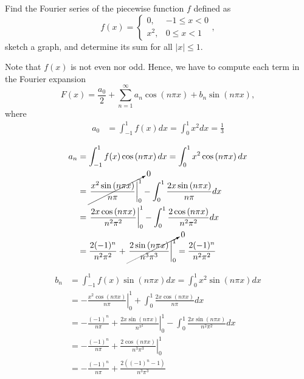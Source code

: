 \documentclass[11pt]{article}
\begin{document}
\begin{problem}
Find the Fourier series of the piecewise function $f$ defined as
\begin{equation*}
f(x) = \left\{ \begin{array}{lr} 0, & -1 \leq x < 0 \\ x^{2}, & 0 \leq x < 1 \end{array} \right.,
\end{equation*}
sketch a graph, and determine its sum for all $|x|\leq 1$.
\end{problem}
\begin{solution}
Note that $f(x)$ is not even nor odd. Hence, we have to compute each term in the Fourier expansion
\[F(x) = \frac{a_{0}}{2}+\sum_{n=1}^{\infty}a_{n}\cos\left(n\pi x\right) + b_{n}\sin \left(n\pi x\right),\]
where
\begin{equation*}
\begin{split}
a_{0} & = \int_{-1}^{1}f(x)dx = \int_{0}^{1}x^{2}dx = \frac{1}{3}
\end{split}
\end{equation*}


\begin{equation*}
\begin{split}
a_{n} & = \int_{-1}^{1}f(x)\cos \left(n\pi x\right) dx = \int_{0}^{1}x^{2}\cos \left(n\pi x\right) dx \\
      & = \cancelto{0}{\left.\frac{x^{2}\sin \left(n\pi x\right)}{n\pi}\right|_{0}^{1}} - \int_{0}^{1}\frac{2x\sin \left(n\pi x\right)}{n\pi}dx \\
      & = \left. \frac{2x\cos \left(n\pi x\right)}{n^{2}\pi^{2}}\right|_{0}^{1} - \int_{0}^{1} \frac{2\cos \left(n\pi x\right)}{n^{2}\pi^{2}}dx \\
      & = \frac{2(-1)^{n}}{n^{2}\pi^{2}} + \cancelto{0}{\left. \frac{2\sin \left(n\pi x\right)}{n^{3}\pi^{3}}\right|_{0}^{1}} = \frac{2(-1)^{n}}{n^{2}\pi^{2}}
\end{split}
\end{equation*}


\begin{equation*}
\begin{split}
b_{n} & = \int_{-1}^{1}f(x)\sin \left(n\pi x\right)dx = \int_{0}^{1}x^{2}\sin \left(n\pi x\right)dx \\
      & = -\left.\frac{x^{2}\cos \left(n\pi x\right)}{n\pi}\right|_{0}^{1} + \int_{0}^{1}\frac{2x\cos \left(n\pi x\right)}{n\pi} dx \\
      & = -\frac{(-1)^{n}}{n\pi} + \left.\frac{2x\sin\left(n\pi x\right)}{n^{\pi^{2}}}\right|_{0}^{1} - \int_{0}^{1}\frac{2x\sin\left(n\pi x\right)}{n^{2}\pi^{2}}dx \\
      & = -\frac{(-1)^{n}}{n\pi} + \left.\frac{2\cos\left(n\pi x\right)}{n^{3}{\pi^{3}}}\right|_{0}^{1} \\
      & = -\frac{(-1)^{n}}{n\pi} + \frac{2((-1)^{n}-1)}{n^{3}\pi^{3}}
\end{split}
\end{equation*}


\end{solution}
\end{document}
